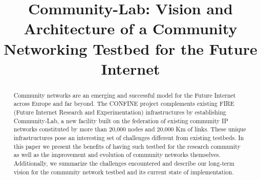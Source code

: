 \documentclass[conference]{IEEEtran}
\begin{document}
\title{Community-Lab: Vision and Architecture of a Community Networking Testbed for the Future Internet}



\author{%
}

\maketitle


\begin{abstract}
Community networks are an emerging and successful model for the Future Internet across Europe and far beyond. The CONFINE project complements existing FIRE (Future Internet Research and Experimentation) infrastructures by establishing Community-Lab, a new facility built on the federation of existing community IP networks constituted by more than 20,000 nodes and 20,000 Km of links. These unique infrastructures pose an interesting set of challenges different from existing testbeds. In this paper we present the benefits of having such testbed for the research community as well as the improvement and evolution of community networks themselves. Additionally, we summarize the challenges encountered and describe our long-term vision for the community network testbed and its current state of implementation.
\end{abstract}
\end{document}
